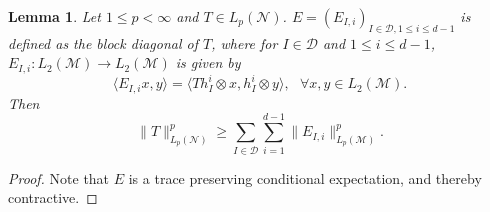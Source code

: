 \documentclass[oneside,english,a4wide]{amsart}
\numberwithin{equation}{section}
\numberwithin{figure}{section}
\theoremstyle{plain}
\theoremstyle{plain}
\theoremstyle{definition}
\theoremstyle{plain}
\newtheorem{lemma}[thm]{Lemma}
\theoremstyle{remark}
\theoremstyle{definition}
\theoremstyle{remark}
\theoremstyle{definition}
\newcommand{\M}{{\mathcal M}}
\newcommand{\8}{\infty}
\begin{document}
\begin{lemma}\label{lem3.1}
	Let $1\le p<\infty$ and $T\in L_p(\mathcal{N})$. $E=(E_{I,i})_{I\in\mathcal{D},1\le i\le d-1}$ is defined as the block diagonal of $T$, where for $I\in\mathcal{D}$ and $1\le i\le d-1$, $E_{I,i}:L_2(\mathcal{M})\to L_2(\mathcal{M})$ is given by
	\[\langle E_{I,i}x,y\rangle=\langle Th_I^i\otimes x,h_I^i\otimes y\rangle,\,\,\,\,\forall x,y\in L_2(\mathcal{M}).\] Then 
	\begin{equation*}
		\|T\|^p_{L_p(\mathcal{N})}\ge \sum_{I\in \mathcal{D}}\sum_{i=1}^{d-1}\|E_{I,i}\|^p_{L_p(\mathcal{M})}.
	\end{equation*}
\end{lemma}
\begin{proof}
	Note that $E$ is a trace preserving conditional expectation, and thereby contractive.
\end{proof}
\end{document}
